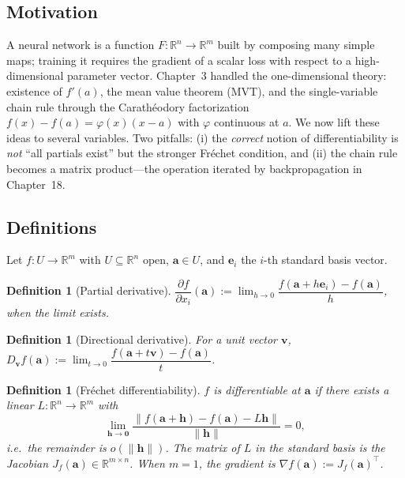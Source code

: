 \documentclass[11pt]{article}
\newtheorem{definition}[theorem]{Definition}
\theoremstyle{remark}
\begin{document}
\subsection*{Motivation}

A neural network is a function $F:\mathbb{R}^n\to\mathbb{R}^m$ built by composing many simple maps; training it requires the gradient of a scalar loss with respect to a high-dimensional parameter vector. Chapter~3 handled the one-dimensional theory: existence of $f'(a)$, the mean value theorem (MVT), and the single-variable chain rule through the Carath\'eodory factorization $f(x)-f(a)=\varphi(x)(x-a)$ with $\varphi$ continuous at $a$. We now lift these ideas to several variables. Two pitfalls: (i) the \emph{correct} notion of differentiability is \emph{not} ``all partials exist'' but the stronger Fr\'echet condition, and (ii) the chain rule becomes a matrix product---the operation iterated by backpropagation in Chapter~18.

\subsection*{Definitions}

Let $f:U\to\mathbb{R}^m$ with $U\subseteq\mathbb{R}^n$ open, $\mathbf{a}\in U$, and $\mathbf{e}_i$ the $i$-th standard basis vector.

\begin{definition}[Partial derivative]
$\dfrac{\partial f}{\partial x_i}(\mathbf{a}) := \lim_{h\to 0}\dfrac{f(\mathbf{a}+h\mathbf{e}_i)-f(\mathbf{a})}{h}$, when the limit exists.
\end{definition}

\begin{definition}[Directional derivative]
For a unit vector $\mathbf{v}$, $D_\mathbf{v} f(\mathbf{a}):=\lim_{t\to 0}\dfrac{f(\mathbf{a}+t\mathbf{v})-f(\mathbf{a})}{t}$.
\end{definition}

\begin{definition}[Fr\'echet differentiability]
$f$ is \emph{differentiable} at $\mathbf{a}$ if there exists a linear $L:\mathbb{R}^n\to\mathbb{R}^m$ with
\[
\lim_{\mathbf{h}\to\mathbf{0}}\frac{\|f(\mathbf{a}+\mathbf{h})-f(\mathbf{a})-L\mathbf{h}\|}{\|\mathbf{h}\|}=0,
\]
i.e.\ the remainder is $o(\|\mathbf{h}\|)$. The matrix of $L$ in the standard basis is the \emph{Jacobian} $J_f(\mathbf{a})\in\mathbb{R}^{m\times n}$. When $m=1$, the \emph{gradient} is $\nabla f(\mathbf{a}):=J_f(\mathbf{a})^\top$.
\end{definition}
\end{document}
